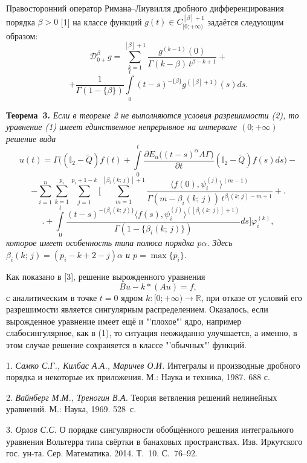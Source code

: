 Правосторонний оператор Римана--Лиувилля дробного дифференцирования порядка $\beta>0$   [1] на классе функций $g(t)\in C_{[0;+\infty)}^{[\beta]+1}$ задаётся следующим образом:
$$
{\mathscr D}^{\beta}_{0+}g=\sum\limits_{k=1}^{[\beta]+1}\frac{g^{(k-1)}(0)}{\Gamma(k-\beta)\,t^{\beta-k+1}}+
$$
$$
+\frac{1}{\Gamma(1-\lbrace\beta\rbrace)}\int\limits_{0}^{t}(t-s)^{-\lbrace\beta\rbrace}g^{([\beta]+1)}(s)ds.
$$

\textbf{Теорема~3.} {\it Если в теореме 2 не выполняются условия разрешимости (2), то уравнение (1) имеет единственное непрерывное на интервале $(0; +\infty)$ решение вида
$$
u(t)=\Gamma\biggl((\mathbb I_{2}-\tilde{Q})f(t)+\int\limits_{0}^{t}\frac{\partial E_{\alpha}\bigl((t-s)^{\alpha}A\Gamma\bigr)}{\partial t}(\mathbb I_{2}-\tilde{Q})f(s)ds\biggr)-
$$
$$
-\sum\limits_{i=1}^{n}\sum\limits_{k=1}^{p_{i}}\sum\limits_{j=1}^{p_{i}+1-k}\biggl[\sum\limits_{m=1}^{[\beta_{i}(k;\,j)]+1}\frac{\langle f(0),\psi_{i}^{(j)}\rangle^{(m-1)}}{\Gamma(m-\beta_{i}(k;\,j))\,t^{\beta_{i}(k;\,j)-m+1}}+\biggr.
$$
$$
\biggl.+\int\limits_{0}^{t}\frac{(t-s)^{-\lbrace\beta_{i}(k;\,j)\rbrace}\langle f(s),\psi_{i}^{(j)}\rangle^{([\beta_{i}(k;\,j)]+1)}}{\Gamma(1-\lbrace\beta_{i}(k;\,j)\rbrace)}ds\biggr]\varphi_{i}^{(k)},
$$
которое имеет особенность типа полюса порядка $p\alpha$. Здесь $\beta_{i}(k;\,j)=(p_{i}-k+2-j)\alpha$ и $p=\max\lbrace p_{i}\rbrace$.}

Как показано в [3], решение вырожденного уравнения
$$
Bu-k\ast(Au)=f,
$$
с аналитическим в точке $t=0$ ядром $k: [0;+\infty)\to{\mathbb R}$, при отказе  от условий его разрешимости является сингулярным распределением. Оказалось, если вырожденное уравнение имеет ещё и "'плохое"' ядро, например слабосингулярное, как в (1), то ситуация неожиданно улучшается, а именно, в этом случае решение сохраняется в классе "'обычных"' функций.
\\
\litlist

1. {\it Самко С.Г., Килбас А.А., Маричев О.И.} Интегралы и производные дробного порядка и некоторые их приложения. М.: Наука и техника, 1987. 688 с.

2. {\it Вайнберг М.М., Треногин В.А.} Теория ветвления решений нелинейных уравнений. М.: Наука, 1969. 528~с.

3. {\it Орлов С.С.} О порядке сингулярности обобщённого решения интегрального уравнения Вольтерра типа свёртки в банаховых пространствах. Изв. Иркутского гос. ун-та. Сер. Математика. 2014. Т.~10. С.~76--92.
